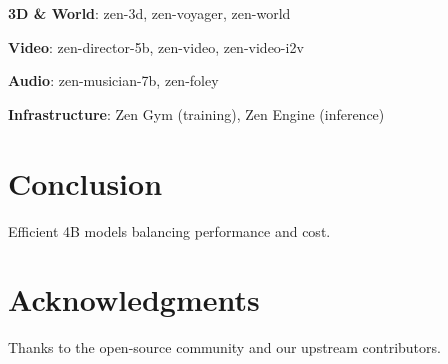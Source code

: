 \documentclass[11pt,a4paper]{article}
\begin{document}
\textbf{3D \& World}: zen-3d, zen-voyager, zen-world

\textbf{Video}: zen-director-5b, zen-video, zen-video-i2v

\textbf{Audio}: zen-musician-7b, zen-foley

\textbf{Infrastructure}: Zen Gym (training), Zen Engine (inference)

\section{Conclusion}
Efficient 4B models balancing performance and cost.

\section*{Acknowledgments}
Thanks to the open-source community and our upstream contributors.



\end{document}
